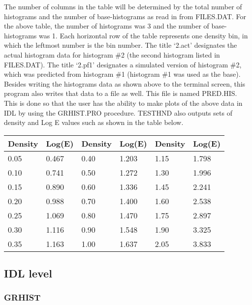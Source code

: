        The number of columns in the table will be determined by the total
   number of histograms and the number of base-histograms as read in from
   FILES.DAT. For the above table, the number of histograms was 3 and the
   number of base-histograms was 1.  Each horizontal row of the table
   represents one density bin, in which the leftmost number is the bin
   number.  The title `2.act' designates the actual histogram data for
   histogram \#2 (the second histogram listed in FILES.DAT).  The title
   `2.pf1' designates a simulated version of histogram \#2, which was
   predicted from histogram \#1 (histogram \#1 was used as the base).
       Besides writing the histograms data as shown above to the terminal
   screen, this program also writes that data to a file as well.  This
   file is named PRED.HIS.  This is done so that the user has the ability
   to make plots of the above data in IDL by using the GRHIST.PRO
   procedure.
       TESTHND also outputs sets of density and Log E values such as shown
   in the table below.
\begin{center}
\begin{tabular}{||l l l l l l||}
\hline
         Density &  Log(E) &   Density &  Log(E)  &    Density &  Log(E) \\
\hline
          0.05 &   0.467   &    0.40  &  1.203    &     1.15  &  1.798  \\
          0.10 &   0.741   &    0.50  &  1.272    &     1.30  &  1.996  \\
          0.15 &   0.890   &    0.60  &  1.336    &     1.45  &  2.241  \\
          0.20 &   0.988   &    0.70  &  1.400    &     1.60  &  2.538  \\
          0.25 &   1.069   &    0.80  &  1.470    &     1.75  &  2.897  \\
          0.30 &   1.116   &    0.90  &  1.548    &     1.90  &  3.325  \\
          0.35 &   1.163   &    1.00  &  1.637    &     2.05  &  3.833  \\
\hline
\end{tabular}
\end{center}

\subsection{IDL level}

\subsubsection{GRHIST}


